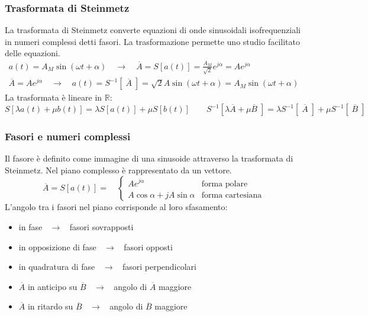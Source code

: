 \documentclass[a4paper]{article}
\begin{document}
\subsubsection*{Trasformata di Steinmetz}
La trasformata di Steinmetz converte equazioni di onde sinusoidali isofrequenziali in numeri complessi detti fasori. La trasformazione
permette uno studio facilitato delle equazioni.
\begin{align*}
	a(t) = A_M \sin (\omega t + \alpha) \quad \rightarrow \quad \overline{A} = S\left[a(t)\right] = \frac{A_M}{\sqrt{2}} e^{j\alpha} = Ae^{j\alpha} \\
	\overline{A} = Ae^{j\alpha} \quad \rightarrow \quad a(t) = S^{-1}\left[\;\overline{A}\;\right] = \sqrt{2} A \sin(\omega t + \alpha) = A_M \sin (\omega t + \alpha)
\end{align*}
La trasformata è lineare in \(\mathbb{R}\):
\[S[\lambda a(t) + \mu b(t)] = \lambda S[a(t)] + \mu S[b(t)] \qquad S^{-1}\left[\lambda\overline{A} + \mu\overline{B}\;\right] = \lambda S^{-1}\left[\;\overline{A}\;\right] + \mu S^{-1}\left[\;\overline{B}\;\right]\]

\subsubsection*{Fasori e numeri complessi}
Il fasore è definito come immagine di una sinusoide attraverso la trasformata di Steinmetz. Nel piano complesso è rappresentato da
un vettore.
\[\overline{A} = S[a(t)] = \quad \begin{cases} Ae^{j\alpha} &\text{forma polare} \\ A\cos\alpha + jA\sin\alpha &\text{forma cartesiana}\end{cases}\]
L'angolo tra i fasori nel piano corrisponde al loro sfasamento:
\begin{center}
	\begin{minipage}{0.5\textwidth}
		\begin{itemize}
			\item in fase \(\;\; \rightarrow \;\;\) fasori sovrapposti
			\item in opposizione di fase \(\;\; \rightarrow \;\;\) fasori opposti
			\item in quadratura di fase \(\;\; \rightarrow \;\;\) fasori perpendicolari
		\end{itemize}
	\end{minipage}
	\begin{minipage}{0.49\textwidth}
		\begin{itemize}
			\item \(\overline{A}\) in anticipo su \(\overline{B}\) \(\;\; \rightarrow \;\;\) angolo di \(\overline{A}\) maggiore
			\item \(\overline{A}\) in ritardo su \(\overline{B}\) \(\;\; \rightarrow \;\;\) angolo di \(\overline{B}\) maggiore
		\end{itemize}
	\end{minipage}
\end{center}
\end{document}
